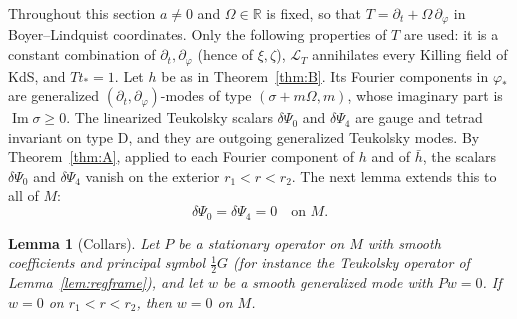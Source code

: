 \documentclass[11pt]{amsart}
\newtheorem{lemma}[theorem]{Lemma}
\theoremstyle{definition}
\theoremstyle{remark}
\numberwithin{equation}{section}
\newcommand{\cL}{\mathcal{L}}
\newcommand{\R}{\mathbb{R}}
\renewcommand{\Im}{\operatorname{Im}}
\begin{document}
Throughout this section $a\ne0$ and $\Omega\in\R$ is fixed, so that $T=\partial_t+\Omega\,\partial_\varphi$ in
Boyer--Lindquist coordinates. Only the following properties of $T$ are used: it is a constant combination of
$\partial_t,\partial_\varphi$ (hence of $\xi,\zeta$), $\cL_T$ annihilates every Killing field of KdS, and $Tt_*=1$. Let $h$ be as in Theorem~\ref{thm:B}. Its Fourier components in $\varphi_*$ are
generalized $(\partial_t,\partial_\varphi)$-modes of type $(\sigma+m\Omega,m)$, whose imaginary part is $\Im\sigma\ge0$. The linearized
Teukolsky scalars $\delta\Psi_0$ and $\delta\Psi_4$ are gauge and tetrad invariant on type D, and they are outgoing
generalized Teukolsky modes. By Theorem~\ref{thm:A}, applied to each Fourier component of $h$ and of $\bar h$, the scalars $\delta\Psi_0$ and
$\delta\Psi_4$ vanish on the exterior $r_1<r<r_2$. The next lemma extends this to all of $M$:
\[
\delta\Psi_0=\delta\Psi_4=0\quad\text{on }M.
\]

\begin{lemma}[Collars]\label{lem:collar}
Let $P$ be a stationary operator on $M$ with smooth coefficients and principal symbol $\frac12G$ (for instance the
Teukolsky operator of Lemma~\ref{lem:regframe}), and let $w$ be a smooth generalized mode with $Pw=0$. If $w=0$ on
$r_1<r<r_2$, then $w=0$ on $M$.
\end{lemma}
\end{document}
